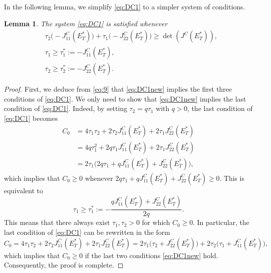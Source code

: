 \documentclass[12pt]{article}
\newtheorem{lemma}[theorem]{Lemma}
\theoremstyle{definition}
\theoremstyle{remark}
\numberwithin{equation}{section}
\begin{document}
In the following lemma, we simplify \eqref{eq:DC1} to a simpler system of conditions.
\begin{lemma}\label{Lemma1}
The system \eqref{eq:DC1} is satisfied whenever
\begin{equation}\label{eq:DC1new}
\begin{split}
&\tau_2\big(-J_{11}^C(E_T^*)\big) + \tau_1\big(-J_{22}^C(E_T^*)\big) \geq \det(J^C(E_T^*)),\\
&\tau_1\geq \tau_1^* := -J_{11}^C(E_T^*),\\
&\tau_2 \geq \tau_2^* := -J_{22}^C(E_T^*).
\end{split}
\end{equation}
\end{lemma}
\begin{proof}
First, we deduce from \eqref{eq:9} that \eqref{eq:DC1new} implies the first three conditions of \eqref{eq:DC1}. We only need to show that \eqref{eq:DC1new} implies the last condition of \eqref{eq:DC1}. Indeed, by setting $\tau_2 = q\tau_1$ with $q > 0$, the last condition of \eqref{eq:DC1} becomes
\begin{equation}
\begin{split}
C_0 &= 4\tau_1\tau_2 + 2\tau_2J_{11}^C(E_T^*) + 2\tau_1J_{22}^C(E_T^*)\\
&= 4q\tau_1^2 + 2q\tau_1J_{11}^C(E_T^*) + 2\tau_1J_{22}^C(E_T^*)\\
&= 2\tau_1\big(2q\tau_1 + q J_{11}^C(E_T^*) + J_{22}^C(E_T^*)\big),
\end{split}
\end{equation}
which implies that $C_0 \geq 0$ whenever $2q\tau_1 + q J_{11}^C(E_T^*) + J_{22}^C(E_T^*) \geq 0$. This is equivalent to
\begin{equation*}
\tau_1 \geq \tau_1^* := -\dfrac{qJ_{11}^C(E_T^*) + J_{22}^C(E_T^*)}{2q}.
\end{equation*}
This means that there always exist $\tau_1, \tau_2 > 0$ for which $C_0 \geq 0$. In particular, the last condition of \eqref{eq:DC1} can be rewritten in the form
\begin{equation*}
C_0 = 4\tau_1\tau_2 + 2\tau_2J_{11}^C(E_T^*) + 2\tau_1J_{22}^C(E_T^*) = 2\tau_1\big(\tau_2 + J_{22}^C(E_T^*)\big) + 2\tau_2\big(\tau_1 + J_{11}^C(E_T^*)\big),
\end{equation*}
which implies that $C_0 \geq 0$ if the last two conditions \eqref{eq:DC1new} hold. Consequently, the proof is complete.
\end{proof}
\end{document}
